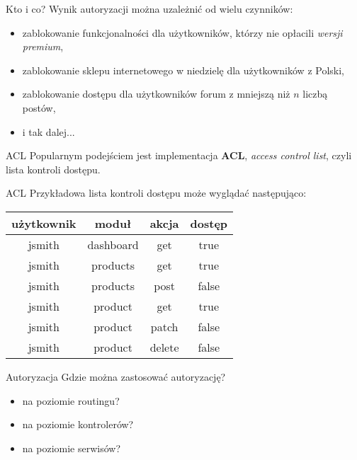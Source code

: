 \begin{frame}{Kto i co?}
	Wynik autoryzacji można uzależnić od wielu czynników:
	\begin{itemize}
		\item zablokowanie funkcjonalności dla użytkowników, którzy nie opłacili \emph{wersji premium},
		\item zablokowanie sklepu internetowego w niedzielę dla użytkowników z Polski,
		\item zablokowanie dostępu dla użytkowników forum z mniejszą niż $n$ liczbą postów,
		\item i tak dalej...
	\end{itemize}
\end{frame}

\begin{frame}{ACL}
	Popularnym podejściem jest implementacja \textbf{ACL}, \emph{access control list}, czyli lista kontroli dostępu.
\end{frame}

\begin{frame}{ACL}
	Przykładowa lista kontroli dostępu może wyglądać następująco:

	\begin{table}
	  \centering
	  \small
	  \begin{tabular}{|c|c|c|c|}
	    \hline
	    \textbf{użytkownik} & \textbf{moduł} & \textbf{akcja} & \textbf{dostęp} \\ \hline
	    jsmith & dashboard & get & true \\ \hline
	    jsmith & products & get & true \\ \hline
	    jsmith & products & post & false \\ \hline
	    jsmith & product & get & true \\ \hline
	    jsmith & product & patch & false \\ \hline
	    jsmith & product & delete & false \\ \hline
	  \end{tabular}
	\end{table}
\end{frame}

\begin{frame}{Autoryzacja}
	Gdzie można zastosować autoryzację?
	\begin{itemize}
		\item na poziomie routingu?
		\item na poziomie kontrolerów?
		\item na poziomie serwisów?
	\end{itemize}
\end{frame}


